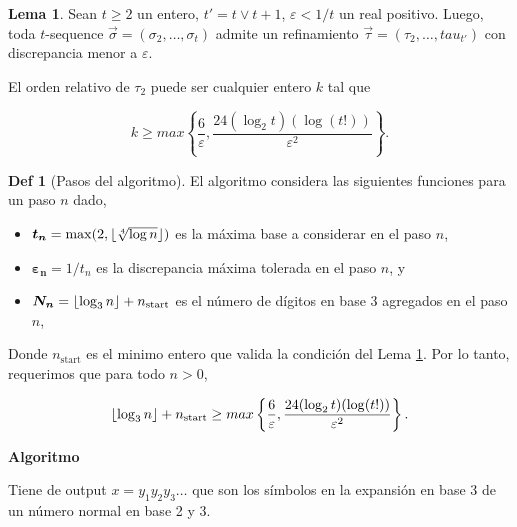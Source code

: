 \documentclass{article}
\DeclarePairedDelimiter\floor{\lfloor}{\rfloor}
\theoremstyle{definition} %
\newtheorem{lemma}{Lema}
\newtheorem*{definition*}{Def}
\newcommand{\sigmatsequence}{\overset{\rightarrow}{\sigma}}
\newcommand{\tautsequence}{\overset{\rightarrow}{\tau}}
\begin{document}
\begin{lemma}\label{lemma:bhs-refinement}
    Sean $t \geq 2$ un entero, $t' = t \vee t + 1$, $\varepsilon < 1/t$ un real
    positivo. Luego, toda $t$-sequence $\sigmatsequence = (\sigma_2, \dots,
    \sigma_t)$ admite un refinamiento $\tautsequence = (\tau_2, \dots,
    tau_{t'})$ con discrepancia menor a $\varepsilon$.

    El orden relativo de $\tau_2$ puede ser cualquier entero $k$ tal que
    
    \[
        k \geq max
        \left\{
            \frac{6}{\varepsilon},
            \frac{24(\log_2 t)(\log(t!))}{\varepsilon^2}
        \right\}.
    \]
\end{lemma}

\begin{definition*}[Pasos del algoritmo]
    El algoritmo considera las siguientes funciones para un paso $n$ dado,
    
    \begin{itemize}
        \item[] $\bm{t_n} = \max(2, \floor{\sqrt[4]{\log n}})$ es la máxima base
        a considerar en el paso $n$,
        \item[] $\bm{\varepsilon_n} = 1/t_n$ es la discrepancia máxima tolerada
        en el paso $n$, y
        \item[] $\bm{N_n} = \floor{\log_3 n} + n_{\text{start}}$ es el número de
        dígitos en base 3 agregados en el paso $n$,
    \end{itemize}

    Donde $n_{\text{start}}$ es el minimo entero que valida la condición del
    Lema \ref{lemma:bhs-refinement}. Por lo tanto, requerimos que para todo $n >
    0$,
    
    \[
        \floor{\log_3 n} + n_{\text{start}} \geq max
        \left\{
            \frac{6}{\varepsilon},
            \frac{24(\log_2 t)(\log(t!))}{\varepsilon^2}
        \right\}.
    \]
    
\end{definition*}

\textbf{Algoritmo}

Tiene de output $x = y_1 y_2 y_3\dots$ que son los símbolos en la expansión en
base 3 de un número normal en base 2 y 3.
\end{document}

